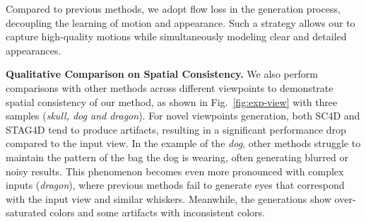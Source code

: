Compared to previous methods, we adopt flow loss in the generation process, decoupling the learning of motion and appearance. Such a strategy allows our \methodname to capture high-quality motions while simultaneously modeling clear and detailed appearances.



\textbf{Qualitative Comparison on Spatial Consistency.} We also perform comparisons with other methods across different viewpoints to demonstrate spatial consistency of our method, as shown in Fig.~\ref{fig:exp-view} with three samples (\textit{skull, dog and dragon}). 
For novel viewpoints generation, both SC4D and STAG4D tend to produce artifacts, resulting in a significant performance drop compared to the input view. In the example of the \textit{dog}, other methods struggle to maintain the pattern of the bag the dog is wearing, often generating blurred or noisy results. This phenomenon becomes even more pronounced with complex inputs (\textit{dragon}), where previous methods fail to generate eyes that correspond with the input view and similar whiskers. Meanwhile, the generations show over-saturated colors and some artifacts with inconsistent colors.

\begin{figure}[t]
\begin{floatrow}



\end{floatrow}
\end{figure}

